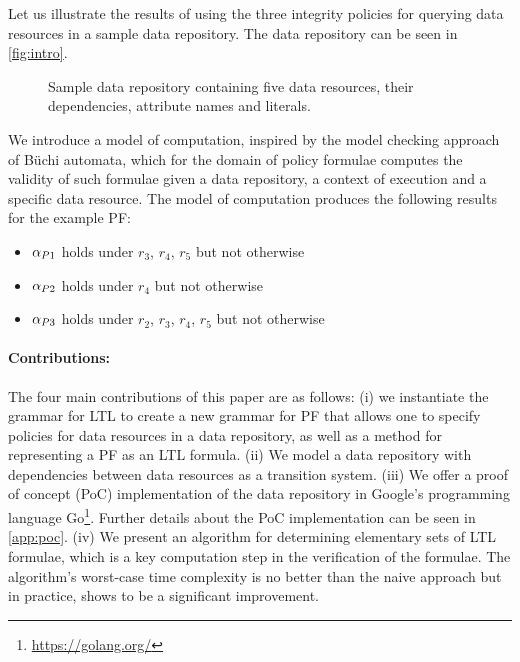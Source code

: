Let us illustrate the results of using the three integrity policies for querying data resources in a sample data repository. The data repository can be seen in \autoref{fig:intro}.
\begin{figure}[!ht]
    \begin{center}
        
        \caption{Sample data repository containing five data resources, their dependencies, attribute names and literals.}
        \label{fig:intro}
    \end{center}
\end{figure}
We introduce a model of computation, inspired by the model checking approach of Büchi automata, which for the domain of policy formulae computes the validity of such formulae given a data repository, a context of execution and a specific data resource. The model of computation produces the following results for the example PF:
\begin{itemize}
    \item $\alpha_{P1}$ holds under $r_3$, $r_4$, $r_5$ but not otherwise
    \item $\alpha_{P2}$ holds under $r_4$ but not otherwise
    \item $\alpha_{P3}$ holds under $r_2$, $r_3$, $r_4$, $r_5$ but not otherwise
\end{itemize}

\paragraph{Contributions:} The four main contributions of this paper are as follows: (i) we instantiate the grammar for LTL to create a new grammar for PF that allows one to specify policies for data resources in a data repository, as well as a method for representing a PF as an LTL formula. (ii) We model a data repository with dependencies between data resources as a transition system. (iii) We offer a proof of concept (PoC) implementation of the data repository in Google's programming language Go\footnote{\href{https://golang.org/}{https://golang.org/}}. Further details about the PoC implementation can be seen in \autoref{app:poc}. (iv) We present an algorithm for determining elementary sets of LTL formulae, which is a key computation step in the verification of the formulae. The algorithm's worst-case time complexity is no better than the naive approach but in practice, shows to be a significant improvement.

